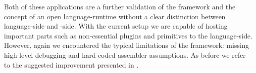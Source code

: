Both of these applications are a further validation of the \B framework and the concept of an open language-runtime without a clear distinction between language-side and \VM-side.
With the current setup we are capable of hosting important \VM parts such as non-essential plugins and primitives to the language-side.
However, again we encountered the typical limitations of the \B framework: missing high-level debugging and hard-coded assembler assumptions.
As before we refer to the suggested \B improvement presented in .


